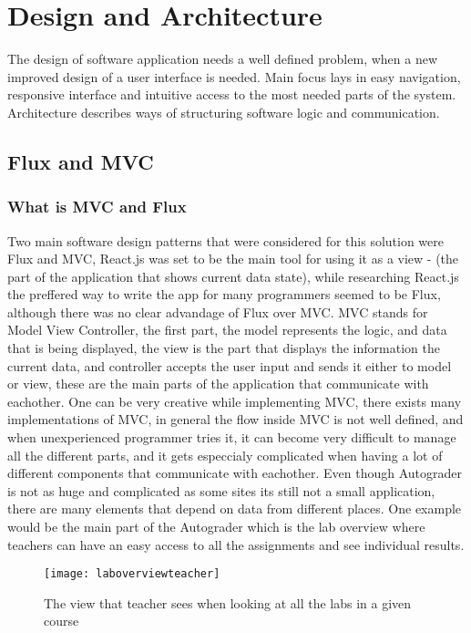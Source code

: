 \chapter{Design and Architecture}

The design of software application needs a well defined problem, when a new improved design of a user interface is needed. Main focus lays in easy navigation, responsive interface and intuitive access to the most needed parts of the system. Architecture describes ways of structuring software logic and communication.

\section{Flux and MVC}\label{sec:fluxmvc}
\subsection{What is MVC and Flux}
Two main software design patterns that were considered for this solution were Flux and MVC, React.js was set to be the main tool for using it as a view - (the part of the application that shows current data state), while researching React.js the preffered way to write the app for many programmers seemed to be Flux, although there was no clear advandage of Flux over MVC. MVC stands for Model View Controller, the first part, the model represents the logic, and data that is being displayed, the view is the part that displays the information the current data, and controller accepts the user input and sends it either to model or view, these are the main parts of the application that communicate with eachother. One can be very creative while implementing MVC, there exists many implementations of MVC, in general the flow inside MVC is not well defined, and when unexperienced programmer tries it, it can become very difficult to manage all the different parts, and it gets especcialy complicated when having a lot of different components that communicate with eachother. Even though Autograder is not as huge and complicated as some sites its still not a small application, there are many elements that depend on data from different places. One example would be the main part of the Autograder which is the lab overview where teachers can have an easy access to all the assignments and see individual results. 

\begin{figure}[h]
  {\texttt{[image: laboverviewteacher]}}
  \caption{The view that teacher sees when looking at all the labs in a given course}
  \label{fig:laboverwievteacher}
\end{figure}

